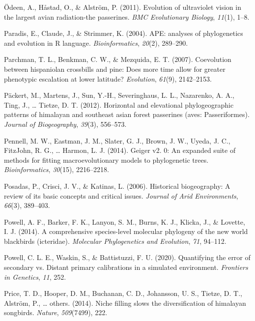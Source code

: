\documentclass[english,man]{apa6}
\begin{document}
\leavevmode\hypertarget{ref-odeen2011evolution}{}%
Ödeen, A., Håstad, O., \& Alström, P. (2011). Evolution of ultraviolet vision in the largest avian radiation-the passerines. \emph{BMC Evolutionary Biology}, \emph{11}(1), 1--8.

\leavevmode\hypertarget{ref-paradis2004}{}%
Paradis, E., Claude, J., \& Strimmer, K. (2004). APE: analyses of phylogenetics and evolution in R language. \emph{Bioinformatics}, \emph{20}(2), 289--290.

\leavevmode\hypertarget{ref-parchman2007coevolution}{}%
Parchman, T. L., Benkman, C. W., \& Mezquida, E. T. (2007). Coevolution between hispaniolan crossbills and pine: Does more time allow for greater phenotypic escalation at lower latitude? \emph{Evolution}, \emph{61}(9), 2142--2153.

\leavevmode\hypertarget{ref-packert2012horizontal}{}%
Päckert, M., Martens, J., Sun, Y.-H., Severinghaus, L. L., Nazarenko, A. A., Ting, J., \ldots{} Tietze, D. T. (2012). Horizontal and elevational phylogeographic patterns of himalayan and southeast asian forest passerines (aves: Passeriformes). \emph{Journal of Biogeography}, \emph{39}(3), 556--573.

\leavevmode\hypertarget{ref-pennell2014geiger}{}%
Pennell, M. W., Eastman, J. M., Slater, G. J., Brown, J. W., Uyeda, J. C., FitzJohn, R. G., \ldots{} Harmon, L. J. (2014). Geiger v2. 0: An expanded suite of methods for fitting macroevolutionary models to phylogenetic trees. \emph{Bioinformatics}, \emph{30}(15), 2216--2218.

\leavevmode\hypertarget{ref-posadas2006historical}{}%
Posadas, P., Crisci, J. V., \& Katinas, L. (2006). Historical biogeography: A review of its basic concepts and critical issues. \emph{Journal of Arid Environments}, \emph{66}(3), 389--403.

\leavevmode\hypertarget{ref-powell2014comprehensive}{}%
Powell, A. F., Barker, F. K., Lanyon, S. M., Burns, K. J., Klicka, J., \& Lovette, I. J. (2014). A comprehensive species-level molecular phylogeny of the new world blackbirds (icteridae). \emph{Molecular Phylogenetics and Evolution}, \emph{71}, 94--112.

\leavevmode\hypertarget{ref-powell2020quantifying}{}%
Powell, C. L. E., Waskin, S., \& Battistuzzi, F. U. (2020). Quantifying the error of secondary vs. Distant primary calibrations in a simulated environment. \emph{Frontiers in Genetics}, \emph{11}, 252.

\leavevmode\hypertarget{ref-price2014niche}{}%
Price, T. D., Hooper, D. M., Buchanan, C. D., Johansson, U. S., Tietze, D. T., Alström, P., \ldots{} others. (2014). Niche filling slows the diversification of himalayan songbirds. \emph{Nature}, \emph{509}(7499), 222.
\end{document}
